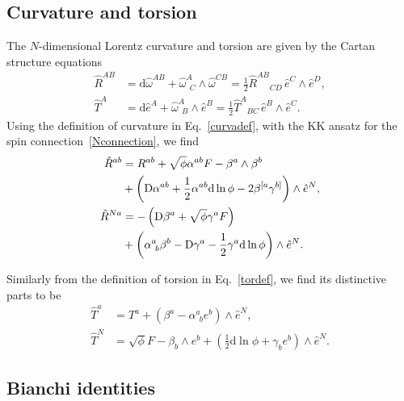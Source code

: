 \documentclass[aps,prd,12pt,superscriptaddress,showpacs,showkeys,longbibliography,reprint,nofootinbib]{revtex4-1}
\begin{document}
\subsection{Curvature and torsion}

The $N$-dimensional Lorentz curvature and torsion are given by the Cartan structure equations
\begin{align}
  \label{curvadef}
  \hat{R}^{AB} &= \mbox{d}\hat{\omega}^{AB}+\hat{\omega}^A_{\ \ C}\wedge\hat{\omega}^{CB} = \frac{1}{2} \hat{R}^{AB}{}_{CD} \, \hat{e}^C \wedge \hat{e}^D,\\
  \label{tordef}
  \hat{T}^A &= \mbox{d}\hat{e}^A+\hat{\omega}^A_{\ \ B}\wedge\hat{e}^B = \frac{1}{2} \hat{T}^{A}{}_{BC} \, \hat{e}^B \wedge \hat{e}^C. 
\end{align}
Using the definition of curvature in Eq.~\eqref{curvadef},  with the KK ansatz for the spin connection~\eqref{Nconnection}, we find
\begin{align}
  \label{R1}
  \hat{R}^{ab}&=R^{ab}+\sqrt{\phi}\alpha^{ab}F-\beta^a\wedge\beta^b\notag\\
  &+\left(\mbox{D}\alpha^{ab}+\frac{1}{2}\alpha^{ab}\mbox{d}\ln\phi-2\beta^{[a}\gamma^{b]}\right)\wedge\hat{e}^N,\\
  \label{R2}
  \hat{R}^{Na}&=-\left(\mbox{D}\beta^a+\sqrt{\phi}\gamma^a F\right)\notag\\
  &+\left(\alpha^a_{\ b}\beta^b-\mbox{D}\gamma^a-\frac{1}{2}\gamma^a\mbox{d}\ln\phi\right)\wedge\hat{e}^N.
\end{align}

Similarly from the definition of torsion in Eq.~\eqref{tordef}, we find its distinctive parts to be
\begin{align}\label{T1}
  \hat{T}^a &= T^a+\left(\beta^a-\alpha^a_{\ \ b}e^b\right)\wedge\hat{e}^N,\\
  \label{T2}
  \hat{T}^N &= \sqrt{\phi}F-\beta_b\wedge e^b+\left(\frac{1}{2}\mbox{d}\ln\phi+\gamma_be^b\right)\wedge\hat{e}^N.
\end{align}

\subsection{Bianchi identities\label{sec:bianchi}}
\end{document}
